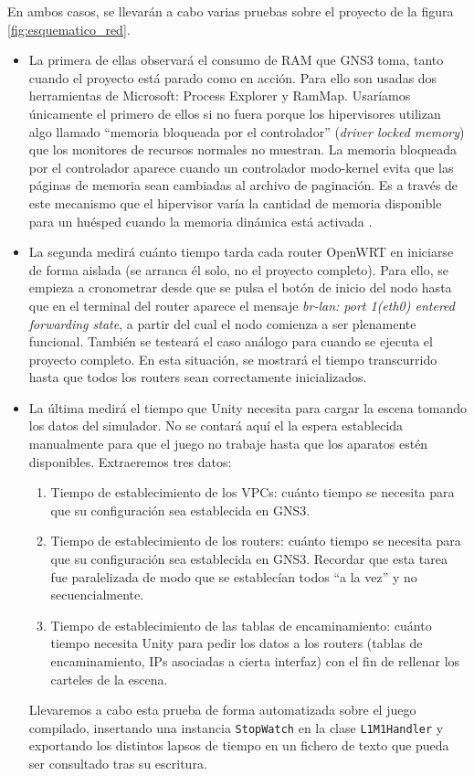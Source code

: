 En ambos casos, se llevarán a cabo varias pruebas sobre el proyecto de la figura \ref{fig:esquematico_red}.
\begin{itemize}
\item La primera de ellas observará el consumo de RAM que GNS3 toma, tanto cuando el proyecto está parado como en acción. Para ello son usadas dos herramientas de Microsoft: Process Explorer y RamMap. Usaríamos únicamente el primero de ellos si no fuera porque los hipervisores utilizan algo llamado ``memoria bloqueada por el controlador'' (\textit{driver locked memory}) que los monitores de recursos normales no muestran. La memoria bloqueada por el controlador aparece cuando un controlador modo-kernel evita que las páginas de memoria sean cambiadas al archivo de paginación. Es a través de este mecanismo que el hipervisor varía la cantidad de memoria disponible para un huésped cuando la memoria dinámica está activada \cite{dlm}.
\item La segunda medirá cuánto tiempo tarda cada router OpenWRT en iniciarse de forma aislada (se arranca él solo, no el proyecto completo). Para ello, se empieza a cronometrar desde que se pulsa el botón de inicio del nodo hasta que en el terminal del router aparece el mensaje \textit{br-lan: port 1(eth0) entered forwarding state}, a partir del cual el nodo comienza a ser plenamente funcional. También se testeará el caso análogo para cuando se ejecuta el proyecto completo. En esta situación, se mostrará el tiempo transcurrido hasta que todos los routers sean correctamente inicializados.
\item La última medirá el tiempo que Unity necesita para cargar la escena tomando los datos del simulador. No se contará aquí el la espera establecida manualmente para que el juego no trabaje hasta que los aparatos estén disponibles. Extraeremos tres datos:
\begin{enumerate}
\item Tiempo de establecimiento de los VPCs: cuánto tiempo se necesita para que su configuración sea establecida en GNS3.
\item Tiempo de establecimiento de los routers: cuánto tiempo se necesita para que su configuración sea establecida en GNS3. Recordar que esta tarea fue paralelizada de modo que se establecían todos ``a la vez'' y no secuencialmente.
\item Tiempo de establecimiento de las tablas de encaminamiento: cuánto tiempo necesita Unity para pedir los datos a los routers (tablas de encaminamiento, IPs asociadas a cierta interfaz) con el fin de rellenar los carteles de la escena.
\end{enumerate}
Llevaremos a cabo esta prueba de forma automatizada sobre el juego compilado, insertando una instancia \texttt{StopWatch} en la clase \texttt{L1M1Handler} y exportando los distintos lapsos de tiempo en un fichero de texto que pueda ser consultado tras su escritura.
\end{itemize}

